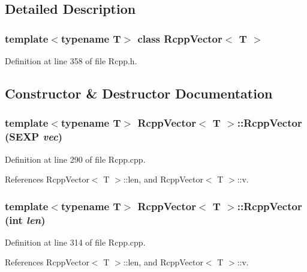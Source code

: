 \subsection{Detailed Description}
\subsubsection*{template$<$typename T$>$ class RcppVector$<$ T $>$}



Definition at line 358 of file Rcpp.h.

\subsection{Constructor \& Destructor Documentation}
\hypertarget{classRcppVector_0925b350f636a546e58ad0329786500a}{
\subsubsection[RcppVector]{\setlength{\rightskip}{0pt plus 5cm}template$<$typename T$>$ {\bf RcppVector}$<$ T $>$::{\bf RcppVector} (SEXP {\em vec})}}
\label{classRcppVector_0925b350f636a546e58ad0329786500a}




Definition at line 290 of file Rcpp.cpp.

References RcppVector$<$ T $>$::len, and RcppVector$<$ T $>$::v.\hypertarget{classRcppVector_eb7797ca2b2ac2d03fee0a543993f17b}{
\subsubsection[RcppVector]{\setlength{\rightskip}{0pt plus 5cm}template$<$typename T$>$ {\bf RcppVector}$<$ T $>$::{\bf RcppVector} (int {\em len})}}
\label{classRcppVector_eb7797ca2b2ac2d03fee0a543993f17b}




Definition at line 314 of file Rcpp.cpp.

References RcppVector$<$ T $>$::len, and RcppVector$<$ T $>$::v.

